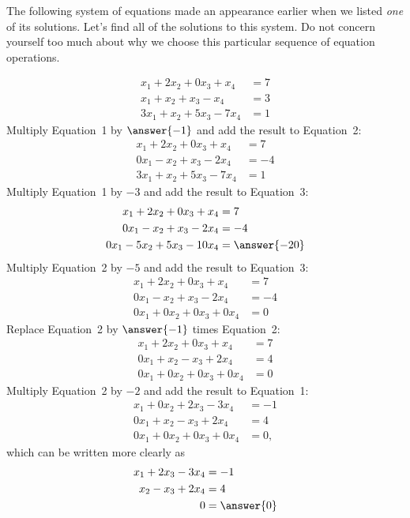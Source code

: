 \documentclass{ximera}
\begin{document}
\begin{example}
  The following system of equations made an appearance earlier when we
  listed \textit{one} of its solutions.  Let's find all of the
  solutions to this system.  Do not concern yourself too much about
  why we choose this particular sequence of equation operations.
  
  \begin{exercise}
    \begin{align*}
      x_1+2x_2 +0x_3+ x_4&= 7\\
      x_1+x_2+x_3-x_4&=3\\
      3x_1+x_2+5x_3-7x_4&=1
    \end{align*}
    Multiply Equation~1 by $\answer{-1}$ and add the result to Equation~2:
    \begin{align*}
      x_1+2x_2 +0x_3+ x_4&= 7\\
      0x_1-x_2+x_3-2x_4&=-4\\
      3x_1+x_2+5x_3-7x_4&=1
    \end{align*}
    Multiply Equation~1 by $-3$ and add the result to Equation~3:
    \begin{align*}
      x_1+2x_2 +0x_3+ x_4&= 7\\
      0x_1-x_2+x_3-2x_4&=-4\\
      0x_1-5x_2+5x_3-10x_4&=\answer{-20}
    \end{align*}
    Multiply Equation~2 by $-5$ and add the result to Equation~3:
    \begin{align*}
      x_1+2x_2 +0x_3+ x_4&= 7\\
      0x_1-x_2+x_3-2x_4&=-4\\
      0x_1+0x_2+0x_3+0x_4&=0
    \end{align*}
    Replace Equation~2 by $\answer{-1}$ times Equation~2:
    \begin{align*}
      x_1+2x_2 +0x_3+ x_4&= 7\\
      0x_1+x_2-x_3+2x_4&=4\\
      0x_1+0x_2+0x_3+0x_4&=0
    \end{align*}
    Multiply Equation~2 by $-2$ and add the result to Equation~1:
    \begin{align*}
      x_1+0x_2 +2x_3-3x_4&= -1\\
      0x_1+x_2-x_3+2x_4&=4\\
      0x_1+0x_2+0x_3+0x_4&=0,
    \end{align*}
    which can be written more clearly as
    \begin{align*}
      x_1+2x_3 - 3x_4&= -1\\
      x_2-x_3+2x_4&=4\\
      0&=\answer{0}
    \end{align*}
  \end{exercise}


\end{example}
\end{document}
